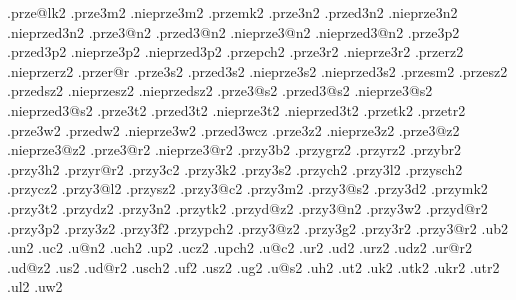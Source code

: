 {  .prze@lk2   
  .prze3m2                .nieprze3m2    
  .przemk2    
  .prze3n2    .przed3n2   .nieprze3n2     .nieprzed3n2
  .prze3@n2   .przed3@n2  .nieprze3@n2    .nieprzed3@n2
  .prze3p2    .przed3p2   .nieprze3p2     .nieprzed3p2
  .przepch2 
  .prze3r2                .nieprze3r2     
  .przerz2                .nieprzerz2     
  .przer@r  
  .prze3s2    .przed3s2   .nieprze3s2     .nieprzed3s2
  .przesm2  
  .przesz2    .przedsz2   .nieprzesz2     .nieprzedsz2
  .prze3@s2   .przed3@s2  .nieprze3@s2    .nieprzed3@s2
  .prze3t2    .przed3t2   .nieprze3t2     .nieprzed3t2
  .przetk2  
  .przetr2  
  .prze3w2    .przedw2    .nieprze3w2     
              .przed3wcz
  .prze3z2                .nieprze3z2     
  .prze3@z2               .nieprze3@z2    
  .prze3@r2               .nieprze3@r2    
%
%
  .przy3b2                      .przygrz2                     .przyrz2  
  .przybr2                      .przy3h2                      .przyr@r2 
  .przy3c2                      .przy3k2                      .przy3s2  
  .przych2                      .przy3l2                      .przysch2 
  .przycz2                      .przy3@l2                     .przysz2  
  .przy3@c2                     .przy3m2                      .przy3@s2 
  .przy3d2                      .przymk2                      .przy3t2  
  .przydz2                      .przy3n2                      .przytk2 
  .przyd@z2                     .przy3@n2                     .przy3w2  
  .przyd@r2                     .przy3p2                      .przy3z2  
  .przy3f2                      .przypch2                     .przy3@z2 
  .przy3g2                      .przy3r2                      .przy3@r2 
%
%
  .ub2                                              .un2    
  .uc2                                              .u@n2   
  .uch2                                             .up2    
  .ucz2                                             .upch2  
  .u@c2                                             .ur2    
  .ud2                                              .urz2   
  .udz2                                             .ur@r2  
  .ud@z2                                            .us2    
  .ud@r2                                            .usch2  
  .uf2                                              .usz2   
  .ug2                                              .u@s2   
  .uh2                                              .ut2    
  .uk2                                              .utk2   
  .ukr2                                             .utr2
  .ul2                                              .uw2    
}
